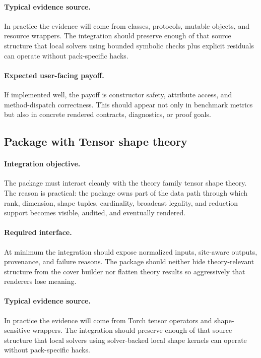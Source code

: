 \documentclass[11pt]{report}
\DeclareRobustCommand{\py}[1]{\texttt{\detokenize{#1}}}
\theoremstyle{definition}
\theoremstyle{plain}
\begin{document}
\paragraph{Typical evidence source.}
In practice the evidence will come from classes, protocols, mutable objects, and resource wrappers. The integration should
preserve enough of that source structure that local solvers using bounded symbolic checks plus explicit residuals
can operate without pack-specific hacks.

\paragraph{Expected user-facing payoff.}
If implemented well, the payoff is constructor safety, attribute access, and method-dispatch correctness. This should appear not only
in benchmark metrics but also in concrete rendered contracts,
diagnostics, or proof goals.


\subsection{Package \py{src/deppy/core} with Tensor shape theory}

\paragraph{Integration objective.}
The package \py{src/deppy/core} must interact cleanly with the
theory family tensor shape theory. The reason is practical: the
package owns part of the data path through which rank, dimension, shape tuples, cardinality, broadcast legality, and reduction support becomes
visible, audited, and eventually rendered.

\paragraph{Required interface.}
At minimum the integration should expose normalized inputs, site-aware
outputs, provenance, and failure reasons. The package should neither hide
theory-relevant structure from the cover builder nor flatten theory
results so aggressively that renderers lose meaning.

\paragraph{Typical evidence source.}
In practice the evidence will come from Torch tensor operators and shape-sensitive wrappers. The integration should
preserve enough of that source structure that local solvers using solver-backed local shape kernels
can operate without pack-specific hacks.
\end{document}
